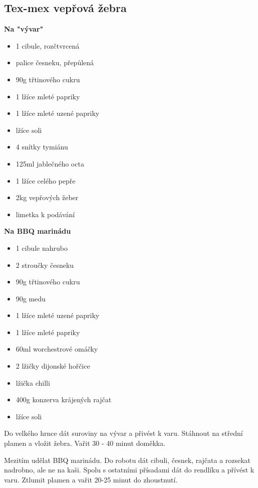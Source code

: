 \documentclass[10pt,a4paper]{article}
\newenvironment{myitemize}
{ \begin{itemize}
    \setlength{\itemsep}{0pt}
    \setlength{\parskip}{0pt}
    \setlength{\parsep}{0pt}     }
{ \end{itemize}                  }
\begin{document}
\subsection{Tex-mex vepřová žebra}
\begin{minipage}[t]{0,5\textwidth}
\textbf{Na "vývar"}
\begin{myitemize} 
  \item 1 cibule, rozčtvrcená
  \item palice česneku, přepůlená
  \item 90g třtinového cukru
  \item 1 lžíce mleté papriky
  \item 1 lžíce mleté uzené papriky
  \item lžíce soli
  \item 4 snítky tymiánu
  \item 125ml jablečného octa
  \item 1 lžíce celého pepře
  \item 2kg vepřových žeber
  \item limetka k podávání
\end{myitemize}

\end{minipage}
\begin{minipage}[t]{0,5\textwidth}
\textbf{Na BBQ marinádu}
\begin{myitemize} 
  \item 1 cibule nahrubo
  \item 2 stroučky česneku
  \item 90g třtinového cukru
  \item 90g medu
  \item 1 lžíce mleté uzené papriky
  \item 1 lžíce mleté papriky
  \item 60ml worchestrové omáčky
  \item 2 lžičky dijonské hořčice
  \item lžička chilli 
  \item 400g konzerva krájených rajčat
  \item lžíce soli
\end{myitemize}

\end{minipage}
\vspace{0.5cm}

Do velkého hrnce dát suroviny na vývar a přivést k varu. Stáhnout na střední plamen a vložit žebra. Vařit 30 - 40 minut doměkka.

Mezitím udělat BBQ marinádu. Do robotu dát cibuli, česnek, rajčata a rozsekat nadrobno, ale ne na kaši. Spolu s ostatními přísadami dát do rendlíku a přívést k varu. Ztlumit plamen a vařit 20-25 minut do zhoustnutí.
\end{document}
